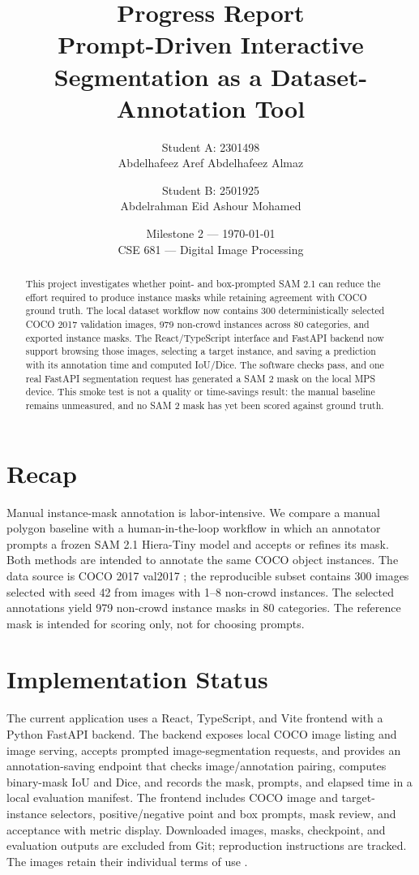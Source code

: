 \documentclass[11pt]{article}
\title{\LARGE Progress Report\\[4pt]
\large Prompt-Driven Interactive Segmentation as a Dataset-Annotation Tool}
\author{
  \begin{tabular}{c}
    Student A: 2301498\\
    Abdelhafeez Aref Abdelhafeez Almaz
  \end{tabular}
  \and
  \begin{tabular}{c}
    Student B: 2501925\\
    Abdelrahman Eid Ashour Mohamed
  \end{tabular}
}
\date{Milestone 2 --- \today\\CSE 681 --- Digital Image Processing}
\begin{document}
\maketitle

\begin{abstract}
This project investigates whether point- and box-prompted SAM 2.1 can reduce the
effort required to produce instance masks while retaining agreement with COCO
ground truth. The local dataset workflow now contains 300 deterministically
selected COCO 2017 validation images, 979 non-crowd instances across 80
categories, and exported instance masks. The React/TypeScript interface and
FastAPI backend now support browsing those images, selecting a target instance,
and saving a prediction with its annotation time and computed IoU/Dice. The
software checks pass, and one real FastAPI segmentation request has generated
a SAM 2 mask on the local MPS device. This smoke test is not a quality or
time-savings result: the manual baseline remains unmeasured, and no SAM 2 mask
has yet been scored against ground truth.
\end{abstract}

\section{Recap}
\label{sec:recap}
Manual instance-mask annotation is labor-intensive. We compare a manual polygon
baseline with a human-in-the-loop workflow in which an annotator prompts a
frozen SAM 2.1 Hiera-Tiny model and accepts or refines its mask. Both methods
are intended to annotate the same COCO object instances. The data source is
COCO 2017 val2017 \citep{lin2014coco}; the reproducible subset contains 300
images selected with seed 42 from images with 1--8 non-crowd instances. The
selected annotations yield 979 non-crowd instance masks in 80 categories. The
reference mask is intended for scoring only, not for choosing prompts.

\section{Implementation Status}
\label{sec:status}
The current application uses a React, TypeScript, and Vite frontend with a
Python FastAPI backend. The backend exposes local COCO image listing and image
serving, accepts prompted image-segmentation requests, and provides an
annotation-saving endpoint that checks image/annotation pairing, computes
binary-mask IoU and Dice, and records the mask, prompts, and elapsed time in a
local evaluation manifest. The frontend includes COCO image and target-instance
selectors, positive/negative point and box prompts, mask review, and acceptance
with metric display. Downloaded images, masks, checkpoint, and evaluation
outputs are excluded from Git; reproduction instructions are tracked.
The images retain their individual terms of use \citep{cocoTerms}.
\end{document}

